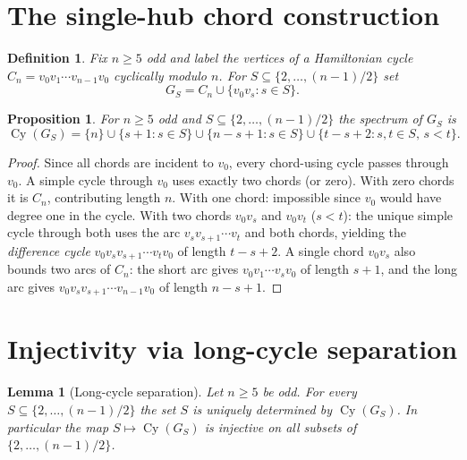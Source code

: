 \documentclass[11pt]{amsart}
\newtheorem{proposition}[theorem]{Proposition}
\newtheorem{lemma}[theorem]{Lemma}
\newtheorem{definition}[theorem]{Definition}
\DeclareMathOperator{\Cy}{Cy}
\begin{document}
\section{The single-hub chord construction}\label{sec:chords}

\begin{definition}
Fix $n\ge 5$ odd and label the vertices of a Hamiltonian cycle
$C_n = v_0v_1\cdots v_{n-1}v_0$ cyclically modulo $n$.  For $S\subseteq
\{2,\ldots,(n-1)/2\}$ set
\[
  G_S = C_n\cup\{v_0v_s : s\in S\}.
\]
\end{definition}

\begin{proposition}\label{prop:spectrum}
For $n\ge 5$ odd and $S\subseteq\{2,\ldots,(n-1)/2\}$ the spectrum of $G_S$ is
\begin{equation}\label{eq:spectrum}
  \Cy(G_S)=\{n\}\cup\{s+1:s\in S\}\cup\{n-s+1:s\in S\}\cup\{t-s+2:s,t\in S,\,s<t\}.
\end{equation}
\end{proposition}

\begin{proof}
Since all chords are incident to $v_0$, every chord-using cycle passes through $v_0$.
A simple cycle through $v_0$ uses exactly two chords (or zero).  With zero chords it
is $C_n$, contributing length $n$.  With one chord: impossible since $v_0$ would
have degree one in the cycle.  With two chords $v_0v_s$ and $v_0v_t$ ($s<t$): the
unique simple cycle through both uses the arc $v_s v_{s+1}\cdots v_t$ and both
chords, yielding the \emph{difference cycle}
$v_0 v_s v_{s+1}\cdots v_t v_0$ of length $t-s+2$.  A single chord $v_0v_s$ also
bounds two arcs of $C_n$: the short arc gives $v_0 v_1\cdots v_s v_0$ of length
$s+1$, and the long arc gives $v_0 v_s v_{s+1}\cdots v_{n-1} v_0$ of length
$n-s+1$.\end{proof}

\section{Injectivity via long-cycle separation}\label{sec:inject}

\begin{lemma}[Long-cycle separation]\label{lem:inject}
Let $n\ge 5$ be odd.  For every $S\subseteq\{2,\ldots,(n-1)/2\}$ the set
$S$ is uniquely determined by $\Cy(G_S)$.  In particular the map $S\mapsto\Cy(G_S)$
is injective on all subsets of $\{2,\ldots,(n-1)/2\}$.
\end{lemma}
\end{document}
